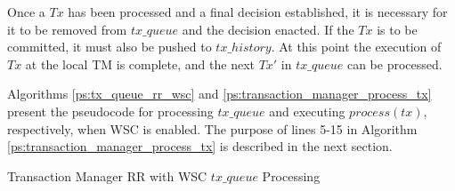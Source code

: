     Once a $Tx$ has been processed and a final decision established, it is necessary for it to be removed from $tx\_queue$ and the decision enacted.  If the $Tx$ is to be committed, it must also be pushed to $tx\_history$.  At this point the execution of $Tx$ at the local TM is complete, and the next $Tx'$ in $tx\_queue$ can be processed.  
    
    Algorithms \ref{ps:tx_queue_rr_wsc} and \ref{ps:transaction_manager_process_tx} present the pseudocode for processing $tx\_queue$ and executing $process(tx)$, respectively, when WSC is enabled.  The purpose of lines 5-15 in Algorithm \ref{ps:transaction_manager_process_tx} is described in the next section.  
    
    \begin{algorithm}
        \caption{Transaction Manager RR with WSC $tx\_queue$ Processing}
        \label{ps:tx_queue_rr_wsc}
        \begin{algorithmic}[1]
                
		                 \ENDWHILE
		                 
                        \ENDIF
                    \ENDIF
                \ENDIF
            \ENDWHILE
        \end{algorithmic}%
    \end{algorithm}

